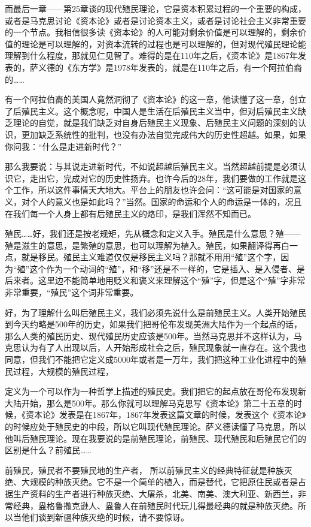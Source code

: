 \documentclass[UTF8, 12pt, a4paper]{ctexrep}
\begin{document}
而最后一章——第25章谈的现代殖民理论，它是资本积累过程的一个重要的构成，或者是马克思讨论《资本论》或者是讨论资本主义，或者是讨论社会主义非常重要的一个节点。我相信很多读《资本论》的人可能对剩余价值是可以理解的，剩余价值的理论是可以理解的，对资本流转的过程也是可以理解的，但对现代殖民理论能理解到什么程度，那就见仁见智了。难得的是在110年之后，《资本论》是1867年发表的，萨义德的《东方学》是1978年发表的，就是在110年之后，有一个阿拉伯裔的……

有一个阿拉伯裔的美国人竟然洞彻了《资本论》的这一章，他读懂了这一章，创立了后殖民主义。这个概念呢，中国人是生活在后殖民主义当中，但对后殖民主义缺乏理论的自觉，就是我们缺乏对自身后殖民主义现象、后殖民主义问题的深刻的认识，更加缺乏系统性的批判，也没有办法自觉完成伟大的历史性超越。如果，如果你问我：“什么是走进新时代？”

那么我要说：与其说走进新时代，不如说超越后殖民主义。当然超越前提是必须认识它，走出它，完成对它的历史性扬弃。也许今后的28年，我们要做的工作就是这个工作，所以这件事情天大地大。平台上的朋友也许会问：“这可能是对国家的意义，对个人的意义也是如此吗？”当然。国家的命运和个人的命运是一体的，况且在我们每一个人身上都有后殖民主义的烙印，是我们浑然不知而已。

殖民……好，我们还是按老规矩，先从概念和定义入手。殖民是什么意思？殖——殖是滋生的意思，是繁殖的意思，也可以理解为植入。殖民，如果翻译得再白一点，就是移民。殖民主义难道仅仅是移民主义吗？那就不用用“殖”这个字，因为“殖”这个作为一个动词的“殖”，和“移”还是不一样的，它是插入、是入侵者、是后来者。这里边不能简单地用贬义和褒义来理解这个“殖”字，但是这个“殖”字非常非常重要，“殖民”这个词非常重要。

好，为了理解什么叫后殖民主义，我们必须先说什么是前殖民主义。人类开始殖民到今天约略是500年的历史，如果我们把哥伦布发现美洲大陆作为一个起点的话，那么人类的殖民历史、现代殖民历史应该是500年。当然马克思并不这样认为，马克思认为有了人出现以后，人开始形成社会之后，殖民现象就一直存在。这个我也同意，但我们不能把它定义成5000年或者是一万年，我们把这种工业化进程中的殖民过程，大规模的殖民过程，

定义为一个可以作为一种哲学上描述的殖民史。我们把它的起点放在哥伦布发现新大陆开始，那么是500年。那么你就可以理解马克思写《资本论》第二十五章的时候，《资本论》发表是在1867年，1867年发表这篇文章的时候，发表这个《资本论》的时候应处于殖民史的中段，所以它叫现代殖民理论。萨义德读懂了马克思，所以他叫后殖民理论。现在我要说的是前殖民理论，前殖民、现代殖民和后殖民它们的区别是什么？前殖民……

前殖民，殖民者不要殖民地的生产者， 所以前殖民主义的经典特征就是种族灭绝、大规模的种族灭绝。它不是一个简单的植入，而是替代，它把原住民或者是占据生产资料的生产者进行种族灭绝、大屠杀，北美、南美、澳大利亚、新西兰，非常经典，盎格鲁撒克逊人、盎鲁人在前殖民时代玩儿得最经典的就是种族灭绝。所以当他们谈到新疆种族灭绝的时候，请不要惊讶。
\end{document}
